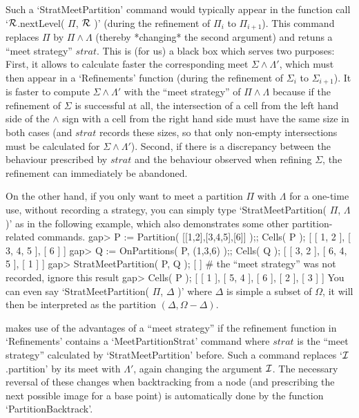 %
Such a  `StratMeetPartition'   command would   typically appear in    the
function call `${\cal R}$.nextLevel(  $\Pi$, ${\cal R}$ )'  (during the refinement of
$\Pi_i$  to  $\Pi_{i+1}$). This   command  replaces  $\Pi$  by $\Pi\wedge
\Lambda$ (thereby  *changing* the  second  argument) and retuns  a ``meet
strategy''  $strat$. This  is  (for  us) a  black   box which  serves two
purposes:  First, it allows {\GAP} to  calculate faster the corresponding
meet $\Sigma\wedge \Lambda'$,  which must then  appear in a `Refinements'
function  (during the refinement of  $\Sigma_i$ to $\Sigma_{i+1}$). It is
faster  to compute $\Sigma\wedge \Lambda'$ with  the ``meet strategy'' of
$\Pi\wedge \Lambda$ because  if the refinement  of $\Sigma$ is successful
at  all, the  intersection  of a  cell from   the left hand  side of  the
$\wedge$ sign  with a cell  from the right hand side  must  have the same
size   in both cases  (and  $strat$  records these   sizes, so  that only
non-empty intersections must  be calculated for $\Sigma\wedge \Lambda'$).
Second, if  there  is a discrepancy  between  the behaviour prescribed by
$strat$ and the behaviour observed when refining $\Sigma$, the refinement
can immediately be abandoned.

On  the  other hand, if you  only  want to meet   a  partition $\Pi$ with
$\Lambda$  for  a one-time  use, without recording   a strategy,  you can
simply type `StratMeetPartition( $\Pi$, $\Lambda$ )'  as in the following
example, which also demonstrates some other partition-related commands.
\beginexample
    gap> P := Partition( [[1,2],[3,4,5],[6]] );;  Cells( P );
    [ [ 1, 2 ], [ 3, 4, 5 ], [ 6 ] ]
    gap> Q := OnPartitions( P, (1,3,6) );;  Cells( Q );
    [ [ 3, 2 ], [ 6, 4, 5 ], [ 1 ] ]
    gap> StratMeetPartition( P, Q );
    [  ]  # the ``meet strategy'' was not recorded, ignore this result
    gap> Cells( P );
    [ [ 1 ], [ 5, 4 ], [ 6 ], [ 2 ], [ 3 ] ]
\endexample
You can even say  `StratMeetPartition( $\Pi$, $\Delta$ )'  where $\Delta$
is simple  a subset  of  $\Omega$, it   will then  be interpreted as  the
partition $(\Delta,\Omega-\Delta)$.

{\GAP} makes use   of  the advantages  of   a ``meet  strategy''  if  the
refinement   function  in `Refinements'  contains  a `MeetPartitionStrat'
command where   $strat$  is   the    ``meet  strategy''  calculated    by
`StratMeetPartition' before.  Such a command replaces `${\cal I}$.partition' by
its meet with $\Lambda'$, again changing the argument ${\cal I}$. The necessary
reversal of these changes when backtracking from  a node (and prescribing
the next possible image  for a base point) is  automatically done by  the
function `PartitionBacktrack'.

